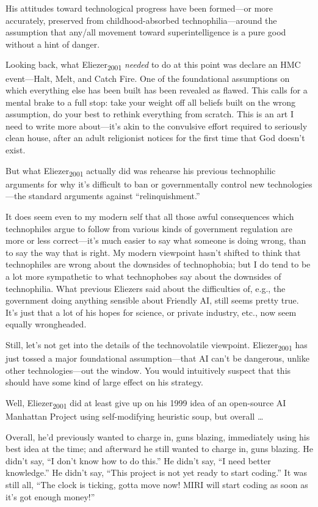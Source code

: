 {
 His attitudes toward technological progress have been formed---or
more accurately, preserved from childhood-absorbed
technophilia---around the assumption that any/all movement toward
superintelligence is a pure good without a hint of danger.}

{
 Looking back, what Eliezer\textsubscript{2001} \textit{needed} to
do at this point was declare an HMC event---Halt, Melt, and Catch Fire.
One of the foundational assumptions on which everything else has been
built has been revealed as flawed. This calls for a mental brake to a
full stop: take your weight off all beliefs built on the wrong
assumption, do your best to rethink everything from scratch. This is an
art I need to write more about---it's akin to the
convulsive effort required to seriously clean house, after an adult
religionist notices for the first time that God doesn't
exist.}

{
 But what Eliezer\textsubscript{2001} actually did was rehearse his
previous technophilic arguments for why it's difficult
to ban or governmentally control new technologies---the standard
arguments against
``relinquishment.''}

{
 It does seem even to my modern self that all those awful
consequences which technophiles argue to follow from various kinds of
government regulation are more or less correct---it's
much easier to say what someone is doing wrong, than to say the way
that is right. My modern viewpoint hasn't shifted to
think that technophiles are wrong about the downsides of technophobia;
but I do tend to be a lot more sympathetic to what technophobes say
about the downsides of technophilia. What previous Eliezers said about
the difficulties of, e.g., the government doing anything sensible about
Friendly AI, still seems pretty true. It's just that a
lot of his hopes for science, or private industry, etc., now seem
equally wrongheaded.}

{
 Still, let's not get into the details of the
technovolatile viewpoint. Eliezer\textsubscript{2001} has just tossed a
major foundational assumption---that AI can't be
dangerous, unlike other technologies---out the window. You would
intuitively suspect that this should have some kind of large effect on
his strategy.}

{
 Well, Eliezer\textsubscript{2001} did at least give up on his 1999
idea of an open-source AI Manhattan Project using self-modifying
heuristic soup, but overall \ldots}

{
 Overall, he'd previously wanted to charge in, guns
blazing, immediately using his best idea at the time; and afterward he
still wanted to charge in, guns blazing. He didn't say,
``I don't know how to do
this.'' He didn't say,
``I need better knowledge.'' He
didn't say, ``This project is not yet
ready to start coding.'' It was still all,
``The clock is ticking, gotta move now! MIRI will
start coding as soon as it's got enough
money!''}

